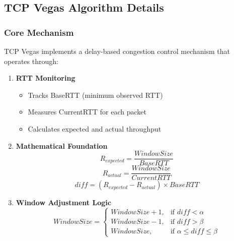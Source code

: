 \documentclass[11pt,a4paper]{article}
\begin{document}
\subsection{TCP Vegas Algorithm Details}
\begin{tcolorbox}[
    enhanced,
    colback=white,
    colframe=blue!75!black,
    title=Algorithm Implementation Details]

\subsubsection{Core Mechanism}
TCP Vegas implements a delay-based congestion control mechanism that operates through:

\begin{enumerate}
    \item \textbf{RTT Monitoring}
    \begin{itemize}
        \item Tracks BaseRTT (minimum observed RTT)
        \item Measures CurrentRTT for each packet
        \item Calculates expected and actual throughput
    \end{itemize}

    \item \textbf{Mathematical Foundation}
    \begin{equation}
        R_{expected} = \frac{WindowSize}{BaseRTT}
    \end{equation}
    \begin{equation}
        R_{actual} = \frac{WindowSize}{CurrentRTT}
    \end{equation}
    \begin{equation}
        diff = (R_{expected} - R_{actual}) \times BaseRTT
    \end{equation}

    \item \textbf{Window Adjustment Logic}
    \begin{equation}
        WindowSize = 
        \begin{cases}
            WindowSize + 1, & \text{if } diff < \alpha \\
            WindowSize - 1, & \text{if } diff > \beta \\
            WindowSize, & \text{if } \alpha \leq diff \leq \beta
        \end{cases}
    \end{equation}
\end{enumerate}


\end{tcolorbox}
\end{document}

